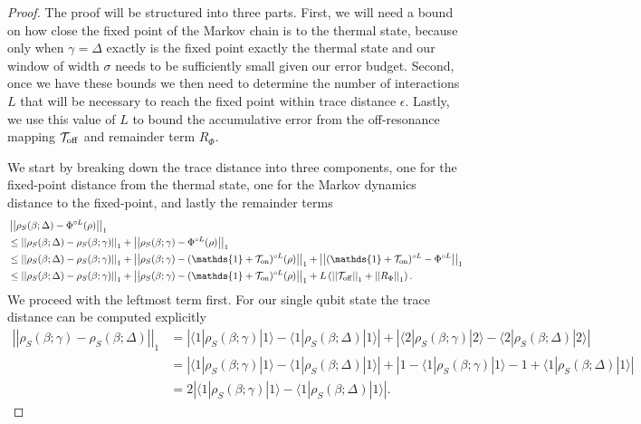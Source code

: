 \documentclass{article}
\newcommand{\on}{\rm on}
\newcommand{\off}{\rm off}
\newcommand{\ket}[1]{|#1\rangle}
\newcommand{\bra}[1]{\langle #1|}
\newcommand{\abs}[1]{\left| #1 \right|}
\newcommand{\norm}[1]{\left| \left| #1 \right| \right|}
\newcommand{\identity}{\mathds{1}}
\begin{document}
\begin{proof}
    The proof will be structured into three parts. First, we will need a bound on how close the fixed point of the Markov chain is to the thermal state, because only when $\gamma = \Delta$ exactly is the fixed point exactly the thermal state and our window of width $\sigma$ needs to be sufficiently small given our error budget. Second, once we have these bounds we then need to determine the number of interactions $L$ that will be necessary to reach the fixed point within trace distance $\epsilon$. Lastly, we use this value of $L$ to bound the accumulative error from the off-resonance mapping $\mathcal{T}_{\off}$ and remainder term $R_{\Phi}$.

    We start by breaking down the trace distance into three components, one for the fixed-point distance from the thermal state, one for the Markov dynamics distance to the fixed-point, and lastly the remainder terms
    \begin{align}
        &\norm{\rho_S(\beta; \Delta) - \Phi^{\circ L}(\rho)}_1 \nonumber \\
        &\le \norm{\rho_S(\beta; \Delta) - \rho_S(\beta; \gamma)}_1 + \norm{\rho_S(\beta; \gamma) - \Phi^{\circ L}(\rho)}_1 \\
        &\le \norm{\rho_S(\beta; \Delta) - \rho_S(\beta; \gamma)}_1 + \norm{\rho_S(\beta; \gamma) - (\identity + \mathcal{T}_{\on})^{\circ L}(\rho)}_1 + \norm{(\identity + \mathcal{T}_{\on})^{\circ L} - \Phi^{\circ L}}_1 \\
        &\le \norm{\rho_S(\beta; \Delta) - \rho_S(\beta; \gamma)}_1 + \norm{\rho_S(\beta; \gamma) - (\identity + \mathcal{T}_{\on})^{\circ L}(\rho)}_1 +  L \left(\norm{\mathcal{T}_{\off}}_1 + \norm{R_{\Phi}}_1 \right). 
    \end{align}
    We proceed with the leftmost term first. For our single qubit state the trace distance can be computed explicitly
 \begin{align}
     \norm{\rho_S(\beta; \gamma) - \rho_S(\beta; \Delta)}_1 &= \abs{\bra{1} \rho_S(\beta; \gamma) \ket{1} - \bra{1}\rho_S(\beta;\Delta)\ket{1}} + \abs{\bra{2} \rho_S(\beta; \gamma) \ket{2} - \bra{2}\rho_S(\beta; \Delta)\ket{2}} \\
     &= \abs{\bra{1} \rho_S(\beta; \gamma) \ket{1} - \bra{1}\rho_S(\beta; \Delta)\ket{1}} + \abs{1 - \bra{1} \rho_S(\beta; \gamma) \ket{1} -1 + \bra{1}\rho_S(\beta; \Delta)\ket{1}} \\
     &= 2 \abs{\bra{1} \rho_S(\beta; \gamma) \ket{1} - \bra{1}\rho_S(\beta; \Delta)\ket{1}}. \label{eq:single_qubit_int_1}

\end{align}
\end{proof}
\end{document}
